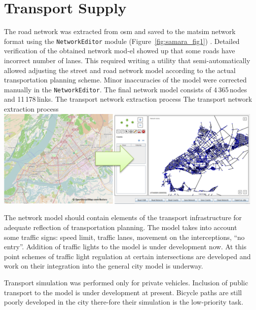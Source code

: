 \section{Transport Supply}
The road network was extracted from \gls{osm} and saved to the \gls{matsim} network format using the \lstinline|NetworkEditor| module (Figure~\ref{fig:samara_fig1}) . Detailed verification of the obtained network mod-el showed up that some roads have incorrect number of lanes. This required writing a utility that semi-automatically allowed adjusting the street and road network model according to the actual transportation planning scheme. Minor inaccuracies of the model were corrected manually in the \lstinline|NetworkEditor|. The final network model consists of 4\,365\,nodes and 11\,178\,links.
%
\createfigure%
{The transport network extraction process}%
{The transport network extraction process}%
{\label{fig:samara_fig1}}%
{\includegraphics[width=0.99\textwidth, angle=0]{./scenarios/figures/samara_fig1.png}}%
{}

The network model should contain elements of the transport infrastructure for adequate reflection of transportation planning. The model takes into account some traffic signs: speed limit, traffic lanes, movement on the interceptions, ``no entry''. Addition of traffic lights to the model is under development now. At this point schemes of traffic light regulation at certain intersections are developed and work on their integration into the general city model is underway.

Transport simulation was performed only for private vehicles. Inclusion of public transport to the model is under development at present. Bicycle paths are still poorly developed in the city there-fore their simulation is the low-priority task. 

